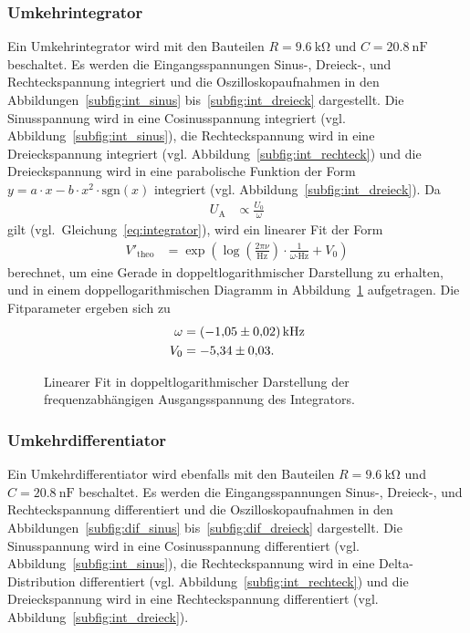 \subsubsection{Umkehrintegrator}
Ein Umkehrintegrator wird mit den Bauteilen $R = \SI{9.6}{\kilo\ohm}$ und $C = \SI{20.8}{\nano\farad}$ beschaltet.
Es werden die Eingangsspannungen Sinus-, Dreieck-, und Rechteckspannung integriert und die Oszilloskopaufnahmen in den Abbildungen~\ref{subfig:int_sinus} bis~\ref{subfig:int_dreieck} dargestellt.
Die Sinusspannung wird in eine Cosinusspannung integriert (vgl. Abbildung~\ref{subfig:int_sinus}),
die Rechteckspannung wird in eine Dreieckspannung integriert (vgl. Abbildung~\ref{subfig:int_rechteck})
und die Dreieckspannung wird in eine parabolische Funktion der Form $y = a \cdot x - b \cdot x^2 \cdot \text{sgn}(x)$ integriert (vgl. Abbildung~\ref{subfig:int_dreieck}).
Da
\begin{align*}
  U_\text{A} &\propto \frac{U_0}{\omega}
\end{align*}
gilt (vgl.\ Gleichung~\eqref{eq:integrator}),
wird ein linearer Fit der Form
\begin{align*}
  V'_\text{theo} &= \exp\!{\left(\log\!{\left(\frac{2 \pi \nu}{\si{\hertz}}\right)} \cdot \frac{1}{\omega\si{\cdot\hertz}} + V_0 \right)}
\end{align*}
berechnet, um eine Gerade in doppeltlogarithmischer Darstellung zu erhalten,
und in einem doppellogarithmischen Diagramm in Abbildung~\ref{fig:int} aufgetragen.
Die Fitparameter ergeben sich zu
\begin{align*}
  \omega &= \SI{-1.05 \pm 0.02}{\kilo\hertz} \\
  V_0 &= \num{-5.34 \pm 0.03}.
\end{align*}

\begin{figure}[ht]
  \centering
  
  \caption{Linearer Fit in doppeltlogarithmischer Darstellung der frequenzabhängigen Ausgangsspannung des Integrators.}
  \label{fig:int}
\end{figure}

\subsubsection{Umkehrdifferentiator}
Ein Umkehrdifferentiator wird ebenfalls mit den Bauteilen $R = \SI{9.6}{\kilo\ohm}$ und $C = \SI{20.8}{\nano\farad}$ beschaltet.
Es werden die Eingangsspannungen Sinus-, Dreieck-, und Rechteckspannung differentiert und die Oszilloskopaufnahmen in den Abbildungen~\ref{subfig:dif_sinus} bis~\ref{subfig:dif_dreieck} dargestellt.
Die Sinusspannung wird in eine Cosinusspannung differentiert (vgl. Abbildung~\ref{subfig:int_sinus}),
die Rechteckspannung wird in eine Delta-Distribution differentiert (vgl. Abbildung~\ref{subfig:int_rechteck})
und die Dreieckspannung wird in eine Rechteckspannung  differentiert (vgl. Abbildung~\ref{subfig:int_dreieck}).


